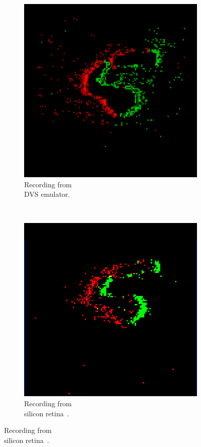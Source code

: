 \documentclass[conference]{IEEEtran}
\begin{document}
\begin{figure}[htb]
  \captionsetup[subfigure]{justification=centering}
  
  \centering
  \begin{subfigure}[b]{0.21\textwidth}
    \includegraphics[width=\textwidth]{camera_demo_1}
    \caption{Recording from \\DVS emulator. }
    \label{fig:cam_demo}
  \end{subfigure}~
  \begin{subfigure}[b]{0.21\textwidth}
    \includegraphics[width=\textwidth]{dvs_demo}
    \caption{Recording from \\silicon retina~\cite{bernabeDVS}.}
    \label{fig:dvs_demo}
  \end{subfigure}
  

\end{figure}
\end{document}

